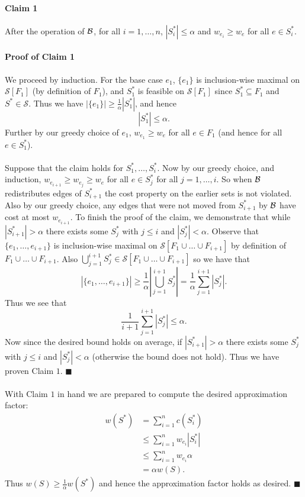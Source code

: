 \documentclass[letterpaper,12pt,oneside,onecolumn]{article}
\newcommand{\cS}{\mathcal{S}} \newcommand{\cT}{\mathcal{T}}
\begin{document}
\paragraph{Claim 1}
After the operation of $\mathcal{B}$, for all $i = 1, \dots, n$, $|S^*_i| \leq \alpha$ and $w_{e_i} \geq w_e$ for all $e \in S^*_i$.
\paragraph{Proof of Claim 1}
We proceed by induction. For the base case $e_1$, $\{e_1\}$ is inclusion-wise maximal on $\cS[F_1]$ (by definition of $F_1$), and $S_1^*$ is feasible on $\cS[F_1]$ since $S^*_1 \subseteq F_1$ and $S^* \in \cS$. Thus we have $|\{e_1\}| \geq \frac{1}{\alpha} |S_1^*|$, and hence
$$|S^*_1| \leq \alpha.$$
Further by our greedy choice of $e_1$, $w_{e_1} \geq w_e$ for all $e \in F_1$ (and hence for all $e \in S^*_1$).
\paragraph{}
Suppose that the claim holds for $S^*_1 ,\dots, S^*_i$. Now by our greedy choice, and induction, $w_{e_{i+1}} \geq w_{e_j} \geq w_e$ for all $e \in S^*_j$ for all $j = 1,\dots, i$. So when $\mathcal{B}$ redistributes edges of $S^*_{i+1}$ the cost property on the earlier sets is not violated. Also by our greedy choice, any edges that were not moved from $S^*_{i+1}$ by $\mathcal{B}$ have cost at most $w_{e_{i+1}}$. To finish the proof of the claim, we demonstrate that while $|S_{i+1}^*| > \alpha$ there exists some $S^*_j$ with $j\leq i$ and $|S^*_j| < \alpha$. Observe that $\{e_1, \dots, e_{i+1}\}$ is inclusion-wise maximal on $\cS[F_1 \cup \dots \cup F_{i+1}]$ by definition of $F_1 \cup \dots \cup F_{i+1}$. Also $\bigcup_{j=1}^{i+1} S^*_j \in \cS[F_1 \cup \dots \cup F_{i+1}]$ so we have that
$$|\{e_1, \dots, e_{i+1}\}| \geq \frac{1}{\alpha} |\bigcup_{j=1}^{i+1} S^*_j | = \frac{1}{\alpha} \sum_{j=1}^{i+1} |S^*_j|.$$
Thus we see that
$$ \frac{1}{i+1}\sum_{j=1}^{i+1} |S^*_j| \leq \alpha.$$
Now since the desired bound holds on average, if $|S^*_{i+1}| > \alpha$ there exists some $S^*_j$ with $j \leq i$ and $|S^*_j| < \alpha$ (otherwise the bound does not hold). Thus we have proven Claim $1$. $\blacksquare$
\paragraph{}
With Claim $1$ in hand we are prepared to compute the desired approximation factor:
\begin{align*}
w(S^*) &= \sum_{i=1}^n c(S^*_i) \\
&\leq \sum_{i=1}^n w_{e_i} |S^*_i| \\
&\leq \sum_{i=1}^n w_{e_i} \alpha \\
&= \alpha w(S).
\end{align*}
Thus $w(S) \geq \frac{1}{\alpha} w(S^*)$ and hence the approximation factor holds as desired. $\blacksquare$
\end{document}
